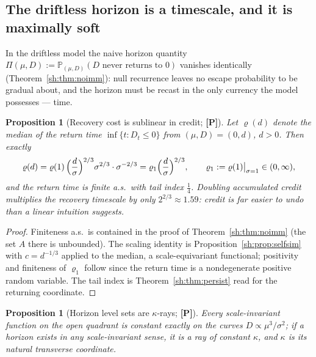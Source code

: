 \documentclass[11pt]{article}
\numberwithin{equation}{section}
\theoremstyle{plain}
\newtheorem{proposition}[theorem]{Proposition}
\theoremstyle{definition}
\theoremstyle{remark}
\newcommand{\PP}{\mathbb{P}}
\begin{document}
\label{sh:sub:horizon}

\subsection{The driftless horizon is a timescale, and it is maximally
soft}\label{sh:subsub:softhorizon}

In the driftless model the naive horizon quantity
$\Pi(\mu,D):=\PP_{(\mu,D)}(D\text{ never returns to }0)$ vanishes
identically (Theorem~\ref{sh:thm:noimm}): null recurrence leaves no escape
probability to be gradual about, and the horizon must be recast in the only
currency the model possesses --- time.

\begin{proposition}[Recovery cost is sublinear in credit; \textbf{[P]}]
\label{sh:prop:recovery}
Let $\varrho(d)$ denote the median of the return time
$\inf\{t:D_t\le0\}$ from $(\mu,D)=(0,d)$, $d>0$. Then exactly
\begin{equation}\label{sh:eq:recovery}
\varrho(d)=\varrho(1)\,\Bigl(\frac d\sigma\Bigr)^{2/3}\sigma^{2/3}\cdot
\sigma^{-2/3}=\varrho_1\Bigl(\frac d\sigma\Bigr)^{2/3},
\qquad \varrho_1:=\varrho(1)\big|_{\sigma=1}\in(0,\infty),
\end{equation}
and the return time is finite a.s.\ with tail index $\tfrac14$. Doubling
accumulated credit multiplies the recovery timescale by only
$2^{2/3}\approx1.59$: credit is far easier to undo than a linear intuition
suggests.
\end{proposition}

\begin{proof}
Finiteness a.s.\ is contained in the proof of
Theorem~\ref{sh:thm:noimm} (the set $A$ there is unbounded). The scaling
identity is Proposition~\ref{sh:prop:selfsim} with $c=d^{-1/3}$ applied to
the median, a scale-equivariant functional; positivity and finiteness of
$\varrho_1$ follow since the return time is a nondegenerate positive random
variable. The tail index is Theorem~\ref{sh:thm:persist} read for the
returning coordinate.
\end{proof}

\begin{proposition}[Horizon level sets are $\kappa$-rays; \textbf{[P]}]
\label{sh:prop:rays}
Every scale-invariant function on the open quadrant is constant exactly on
the curves $D\propto\mu^3/\sigma^2$; if a horizon exists in any
scale-invariant sense, it is a ray of constant $\kappa$, and $\kappa$ is
its natural transverse coordinate.
\end{proposition}
\end{document}
